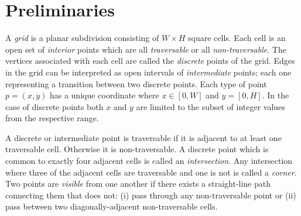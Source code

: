 \section{Preliminaries}
A \emph{grid} is a planar subdivision consisting of $W \times H$ square cells.
Each cell is an open set of \emph{interior} points which are 
all \emph{traversable} or all \emph{non-traversable}.
The vertices associated with each cell are called the \emph{discrete} points
of the grid.  Edges in the grid can be interpreted as open intervals of
\emph{intermediate} points; each one representing a transition between two
discrete points.  Each type of point $p = (x, y)$ has a unique coordinate
where $x \in [0, W]$ and $y = [0, H]$. In the case of discrete points both $x$
and $y$ are limited to the subset of integer values from the respective
range.
\par
A discrete or intermediate point is traversable if it is adjacent to at least
one traversable cell. Otherwise it is non-traversable.  A discrete point which
is common to exactly four adjacent cells is called an \emph{intersection}.
Any intersection where three of the adjacent cells are traversable and one is
not is called a \emph{corner}.  Two points are \emph{visible} from one another
if there exists a straight-line path connecting them that does not: (i) pass
through any non-traversable point or (ii) pass between two diagonally-adjacent
non-traversable cells.

